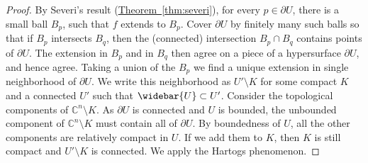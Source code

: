 \documentclass[12pt,openany]{book}
\newcommand{\C}{{\mathbb{C}}}
\theoremstyle{plain}
\theoremstyle{remark}
\theoremstyle{definition}
\theoremstyle{exercise}
\theoremstyle{example}
\newcommand{\thmref}[1]{\hyperref[#1]{Theorem~\ref*{#1}}}
\begin{document}
\begin{proof}
By Severi's result (\thmref{thm:severi}), for every $p \in \partial U$,
there is a small ball $B_p$, such that $f$ extends to $B_p$.  Cover $\partial
U$ by finitely many such balls so that if $B_p$ intersects $B_q$, then
the (connected) intersection $B_p \cap B_q$ contains points of $\partial U$.
The extension in $B_p$ and in $B_q$ then agree on a piece of a hypersurface
$\partial U$, and hence agree.  Taking a union of the $B_p$ we find
a unique extension in single neighborhood of $\partial U$.
We write this neighborhood as $U' \setminus K$ for some compact $K$
and a connected $U'$ such that $\widebar{U} \subset U'$.
Consider the topological components of $\C^n \setminus K$.  As
$\partial U$ is connected and $U$ is bounded,
the unbounded component of $\C^n \setminus K$ must contain all of $\partial U$.
By boundedness of $U$, all the other components are
relatively compact in $U$.  If we add them to $K$, then $K$
is still compact and $U' \setminus K$ is connected.
We apply the Hartogs phenomenon.
\end{proof}
\end{document}
